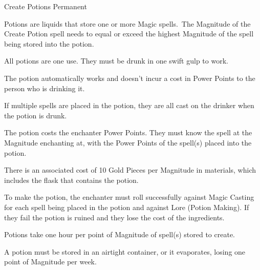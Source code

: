 \begin{rpg-spell}
{Create Potions}
{Permanent}

Potions are liquids that store one or more Magic spells. The Magnitude of the Create Potion spell needs to equal or exceed the highest Magnitude of the spell being stored into the potion.

\begin{rpg-list}
\item All potions are one use. They must be drunk in one swift gulp to work. 
\item The potion automatically works and doesn’t incur a cost in Power Points to the person who is drinking it. 
\item If multiple spells are placed in the potion, they are all cast on the drinker when the potion is drunk.
\item The potion costs the enchanter Power Points. They must know the spell at the Magnitude enchanting at, with the Power Points of the spell(s) placed into the potion. 
\item There is an associated cost of 10 Gold Pieces per Magnitude in materials, which includes the flask that contains the potion. 
\item To make the potion, the enchanter must roll successfully against Magic Casting for each spell being placed in the potion and against Lore (Potion Making). If they fail the potion is ruined and they lose the cost of the ingredients. 
\item Potions take one hour per point of Magnitude of spell(s) stored to create. 
\item A potion must be stored in an airtight container, or it evaporates, losing one point of Magnitude per week. 
\end{rpg-list}
\end{rpg-spell}



